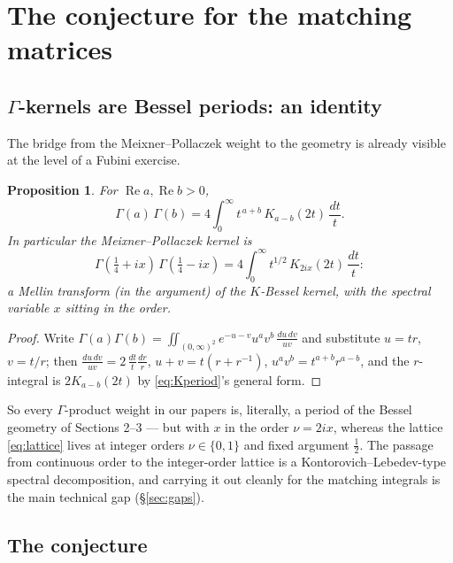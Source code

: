 \documentclass[11pt]{article}
\newtheorem{proposition}{Proposition}[section]
\theoremstyle{definition}
\theoremstyle{remark}
\newcommand{\G}{\Gamma}
\begin{document}
\section{The conjecture for the matching matrices}

\subsection{$\G$-kernels are Bessel periods: an identity}

The bridge from the Meixner--Pollaczek weight to the geometry is
already visible at the level of a Fubini exercise.

\begin{proposition}\label{prop:fubini}
For $\operatorname{Re} a, \operatorname{Re} b > 0$,
\[
  \G(a)\,\G(b)
  = 4\int_0^\infty t^{\,a+b}\,K_{a-b}(2t)\,\frac{dt}{t}.
\]
In particular the Meixner--Pollaczek kernel is
\[
  \G(\tfrac14+ix)\,\G(\tfrac14-ix)
  = 4\int_0^\infty t^{1/2}\,K_{2ix}(2t)\,\frac{dt}{t}:
\]
a Mellin transform (in the argument) of the $K$-Bessel kernel, with
the spectral variable $x$ sitting in the \emph{order}.
\end{proposition}

\begin{proof}
Write $\G(a)\G(b) = \iint_{(0,\infty)^2} e^{-u-v}u^a v^b\,
\frac{du\,dv}{uv}$ and substitute $u = tr$, $v = t/r$; then
$\frac{du\,dv}{uv} = 2\,\frac{dt}{t}\frac{dr}{r}$, $u+v =
t(r + r^{-1})$, $u^av^b = t^{a+b}r^{a-b}$, and the $r$-integral is
$2K_{a-b}(2t)$ by \eqref{eq:Kperiod}'s general form.
\end{proof}

So every $\G$-product weight in our papers is, literally, a period
of the Bessel geometry of Sections 2--3 --- but with $x$ in the
order $\nu = 2ix$, whereas the lattice \eqref{eq:lattice} lives at
integer orders $\nu \in \{0,1\}$ and fixed argument $\tfrac12$. The
passage from continuous order to the integer-order lattice is a
Kontorovich--Lebedev-type spectral decomposition, and carrying it
out cleanly for the matching integrals is the main technical gap
(\S\ref{sec:gaps}).

\subsection{The conjecture}
\end{document}
